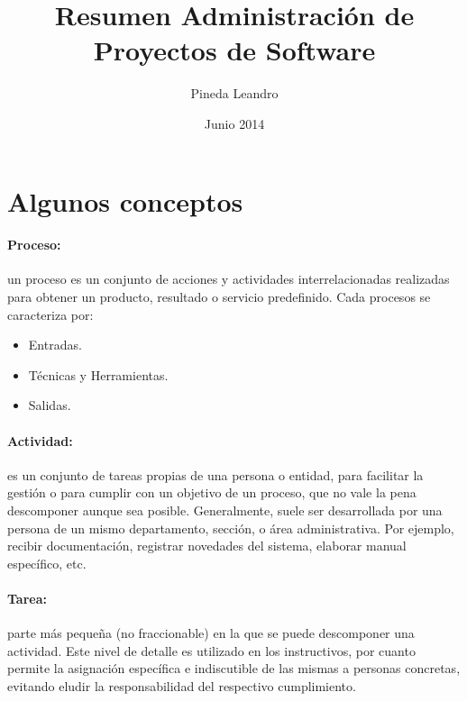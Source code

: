 \documentclass[a4paper,twosides]{article}
\newlength{\wideitemsep}
\let\olditem\item
\renewcommand{\item}{\setlength{\itemsep}{\wideitemsep}\olditem}
\begin{document}
\title{Resumen Administración de Proyectos de Software}
\author{Pineda Leandro}
\date{Junio 2014}
\maketitle

\tableofcontents

\section{Algunos conceptos}

\paragraph{Proceso:} un proceso es un conjunto de acciones y actividades interrelacionadas realizadas para obtener un producto, resultado o servicio predefinido. Cada procesos se caracteriza por:
\begin{itemize}
\item Entradas.
\item Técnicas y Herramientas.
\item Salidas.
\end{itemize}

\paragraph{Actividad:} es un conjunto de tareas propias de una persona o entidad, para facilitar la gestión o para cumplir con un objetivo de un proceso, que no vale la pena descomponer aunque sea posible. Generalmente, suele ser desarrollada por una persona de un mismo departamento, sección, o área administrativa. Por ejemplo, recibir documentación, registrar novedades del sistema, elaborar manual específico, etc.

\paragraph{Tarea:} parte más pequeña (no fraccionable) en la que se puede descomponer una actividad. Este nivel de detalle es utilizado en los instructivos, por cuanto permite la asignación específica e indiscutible de las mismas a personas concretas, evitando eludir la responsabilidad del respectivo cumplimiento.
\end{document}
